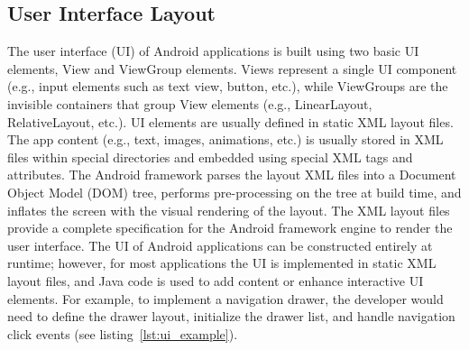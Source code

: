 \subsection{User Interface Layout}
The user interface (UI) of Android applications is built using two basic UI elements, View and ViewGroup elements.
Views represent a single UI component (e.g., input elements such as text view, button, etc.), while ViewGroups are the invisible containers that group View elements (e.g., LinearLayout, RelativeLayout, etc.).
UI elements are usually defined in static XML layout files. The app content (e.g., text, images, animations, etc.) is usually stored in XML files within special directories and embedded using special XML tags and attributes.
The Android framework parses the layout XML files into a Document Object Model (DOM) tree, performs pre-processing on the tree at build time, and inflates the screen with the visual rendering of the layout.
The XML layout files provide a complete specification for the Android framework engine to render the user interface.
The UI of Android applications can be constructed entirely at runtime; however, for most applications the UI is implemented in static XML layout files, and Java code is used to add content or enhance interactive UI elements.
For example, to implement a navigation drawer, the developer would need to define the drawer layout, initialize the drawer list, and handle navigation click events (see listing~\ref{lst:ui_example}).

